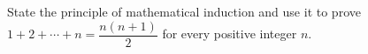 State the principle of mathematical induction and use it to prove $1+2+\cdots+n=\dfrac{n(n+1)}{2}$ for every positive integer $n$.
